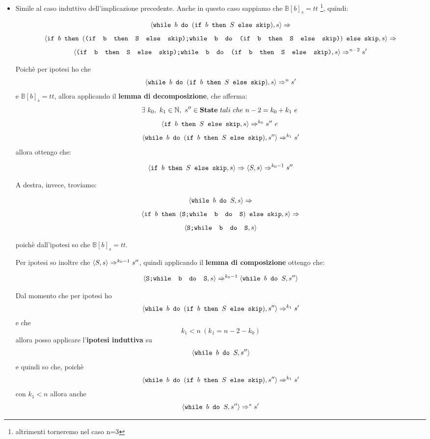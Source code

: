 {\begin{itemize}
	Quindi nel caso in cui \[ \exFourRS{} \] evolva in tre passi in una
	configurazione finale a destra avremo:

\[ 	\confSs{\wbS{b}{(\ifABC{b}{S}{\skipistr})}}{s}\Rar{} \]
\[ 	\confSs{
		\ifABC{b}{(\concat{S}{\wbS{b}{S}})}{\skipistr}
	}{s}\Rar{} \]
\[ \confSs{\skipistr}{s}\Rar{}s \]

	Poichè dall'ipotesi sappiamo che $\mathbb{B}[b]_s=ff$ e quindi entrambi i programmi evolvono nello stesso stato finale.\\
\item   	{} 
	
	
	 Simile al caso induttivo dell'implicazione precedente.
	Anche in questo caso sappiamo che $\mathbb{B}[b]_s=tt$
	\footnote{altrimenti torneremo nel caso n=3}, quindi:

\[ 	\confSs{\wbS{b}{(\ifABC{b}{S}{\skipistr})}}{s}\Rar{} \]
	{\small
\[ \confSs{
		\ifABC{b}
			{(\concat{(\ifABC{b}{S}{\skipistr})}
			{\wbS{b}{(\ifABC{b}{S}{\skipistr})}})}
			{\skipistr}
	}{s}\Rar{} \]
}
\[ 	\confSs{\concat{(\ifABC{b}{S}{\skipistr})}{\wbS{b}
	{(\ifABC{b}{S}{\skipistr})}}}{s}\Rar{n-2}s' \]

	Poichè per ipotesi ho che 
	\[ \confSs{\wbS{b}{(\ifABC{b}{S}{\skipistr})}}{s}\Rar{n}s' \] e 
	$\mathbb{B}[b]_s=tt$, allora applicando il \textbf{lemma di decomposizione},
	che afferma: 
\[ 	\exists{}~k_0,~k_1\in\mathbb{N},~s''\in\states~tali~che~n-2=
	k_0+k_1~e~	\]
	\[\confSs{\ifABC{b}{S}{\skipistr}}{s}\Rar{k_0}s''~e~ \]
	\[\confSs{\wbS{b}
	{(\ifABC{b}{S}{\skipistr})}}{s''}\Rar{k_1}s' \]
 allora ottengo che:

\[ 	\confSs{\ifABC{b}{S}{\skipistr}}{s}\Rar{}\confSs{S}{s}\Rar{k_0-1}s'' \]

	A destra, invece, troviamo:

	\[ \confSs{\wbS{b}{S}}{s}\Rar{} \]
	\[ \confSs{
		\ifABC{b}
		{(\concat{S}
		{\wbS{b}{S}})}
		{\skipistr}}{s}\Rar{} \]
	\[ \confSs{{\concat{S}{\wbS{b}{S}}}}{s} \]

	poichè dall'ipotesi so che $\mathbb{B}[b]_s=tt$. 
	
	Per ipotesi so inoltre che
	$\confSs{S}{s}\Rar{k_0-1}s''$, quindi applicando il \textbf{lemma di
	composizione} ottengo che:

\[ 	\confSs{{\concat{S}{\wbS{b}{S}}}}{s}\Rar{k_0-1}\confSs{\wbS{b}{S}}{s''} \]

	Dal momento che per ipotesi ho 
\[ 	\confSs{\wbS{b}{(\ifABC{b}{S}
	{\skipistr})}}{s''}\Rar{k_1}s' \]
e che 
\[ k_1<n~(k_1=n-2-k_0)  \]allora posso
	applicare l'\textbf{ipotesi induttiva} su 
	\[ \confSs{\wbS{b}{S}}{s''} \] e
	quindi so che, poichè 
\[ 	\confSs{\wbS{b}{(\ifABC{b}{S}{\skipistr})}}
	{s''}\Rar{k_1}s' \] con $k_1<n$ allora anche 
	\[ \confSs{\wbS{b}{S}}{s''}\Rar{*}s' \]
\end{itemize}
}
\newpage